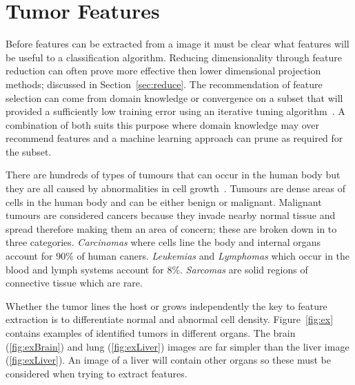 \documentclass[journal]{IEEEtran}
\begin{document}
\section{Tumor Features}
\label{sec:tumor}
Before features can be extracted from a image it must be clear what features will be useful to a classification algorithm.
Reducing dimensionality through feature reduction can often prove more effective then lower dimensional projection methods; discussed in Section~\ref{sec:reduce}.
The recommendation of feature selection can come from domain knowledge or convergence on a subset that will provided a sufficiently low training error using an iterative tuning algorithm~\cite{bu07feature,li10tumor}.
A combination of both suits this purpose where domain knowledge may over recommend features and a machine learning approach can prune as required for the subset.  


There are hundreds of types of tumours that can occur in the human body but they are all caused by abnormalities in cell growth~\cite{cooper1992cancer}.
Tumours are dense areas of cells in the human body and can be either benign or malignant.
Malignant tumours are considered cancers because they invade nearby normal tissue and spread therefore making them an area of concern; these are broken down in to three categories.
\emph{Carcinomas} where cells line the body and internal organs account for $90$\% of human caners.
\emph{Leukemias} and \emph{Lymphomas} which occur in the blood and lymph systems account for $8$\%.
\emph{Sarcomas} are solid regions of connective tissue which are rare.


Whether the tumor lines the host or grows independently the key to feature extraction is to differentiate normal and abnormal cell density. 
Figure~\ref{fig:ex} contains examples of identified tumors in different organs.
The brain (\ref{fig:exBrain}) and lung (\ref{fig:exLiver}) images are far simpler than the liver image (\ref{fig:exLiver}).
An image of a liver will contain other organs so these must be considered when trying to extract features.
\end{document}
